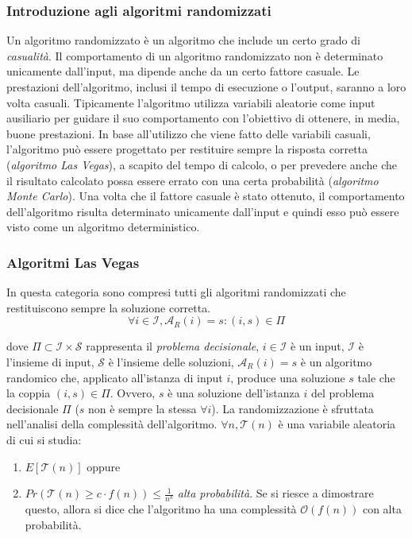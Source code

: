\subsubsection*{Introduzione agli algoritmi randomizzati}
Un algoritmo randomizzato è un algoritmo che include un certo grado di 
\textit{casualità}. Il comportamento di un algoritmo randomizzato non è determinato 
unicamente dall'input, ma dipende anche da un certo fattore casuale. Le prestazioni 
dell'algoritmo, inclusi il tempo di esecuzione o l'output, saranno a loro volta casuali.
Tipicamente l'algoritmo utilizza variabili aleatorie come input ausiliario 
per guidare il suo comportamento con l'obiettivo di ottenere, in media, buone 
prestazioni. In base all'utilizzo che viene fatto delle variabili 
casuali, l'algoritmo può essere progettato per restituire sempre la risposta corretta 
(\textit{algoritmo Las Vegas}), a scapito del tempo di calcolo, o per prevedere 
anche che il risultato calcolato possa essere errato con una certa probabilità 
(\textit{algoritmo Monte Carlo}). Una volta che il fattore casuale è stato ottenuto, 
il comportamento dell'algoritmo risulta determinato unicamente dall'input e quindi 
esso può essere visto come un algoritmo deterministico.

\subsubsection*{Algoritmi Las Vegas}
In questa categoria sono compresi tutti gli algoritmi randomizzati che restituiscono 
sempre la soluzione corretta.
\[
    \forall i \in \mathcal{I}, \mathcal{A}_{R}(i) = s:(i,s) \in \Pi
\]

dove $\Pi \subset \mathcal{I} \times \mathcal{S}$ rappresenta il 
\textit{problema decisionale}, $i \in \mathcal{I}$ è un input, $\mathcal{I}$ è 
l'insieme di input, $\mathcal{S}$ è l'insieme delle soluzioni, 
$\mathcal{A}_{R}(i) = s$ è un algoritmo randomico che, applicato all'istanza di 
input $i$, produce una soluzione $s$ tale che la coppia $(i,s) \in \Pi$. Ovvero, 
$s$ è una soluzione dell'istanza $i$ del problema decisionale $\Pi$ ($s$ non è 
sempre la stessa $\forall i$). La randomizzazione è sfruttata nell'analisi della 
complessità dell'algoritmo. $\forall n, \mathcal{T}(n)$ è una variabile aleatoria di 
cui si studia:
\begin{enumerate}
    \item $E[\mathcal{T}(n)]$ oppure
    \item $Pr(\mathcal{T}(n) \ge c \cdot f(n)) \le \frac{1}{n^k}$ 
    \textit{alta probabilità}. Se si riesce a dimostrare questo, allora si dice che 
    l'algoritmo ha una complessità $\mathcal{O}(f(n))$ con alta probabilità.
\end{enumerate}

